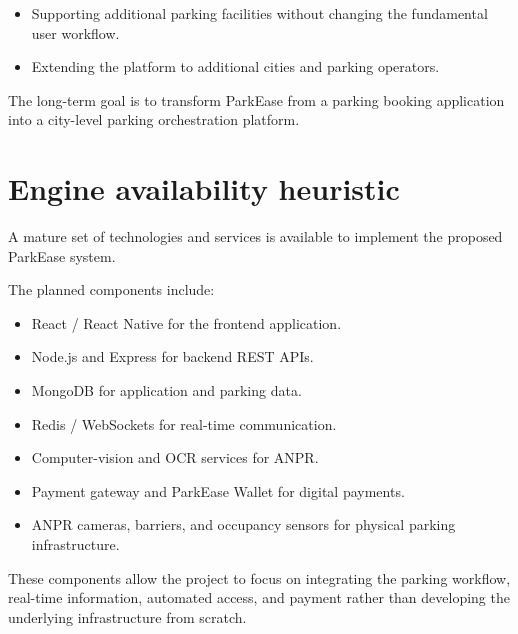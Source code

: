 \documentclass[12pt,a4paper]{article}
\begin{document}
\begin{enumerate}
\begin{itemize}
    \item Supporting additional parking facilities without changing the fundamental user workflow.

    \item Extending the platform to additional cities and parking operators.
\end{itemize}

The long-term goal is to transform ParkEase from a parking booking application into a city-level parking orchestration platform.


\section{Engine availability heuristic}

A mature set of technologies and services is available to implement the proposed ParkEase system.

The planned components include:

\begin{itemize}
    \item React / React Native for the frontend application.

    \item Node.js and Express for backend REST APIs.

    \item MongoDB for application and parking data.

    \item Redis / WebSockets for real-time communication.

    \item Computer-vision and OCR services for ANPR.

    \item Payment gateway and ParkEase Wallet for digital payments.

    \item ANPR cameras, barriers, and occupancy sensors for physical parking infrastructure.
\end{itemize}

These components allow the project to focus on integrating the parking workflow, real-time information, automated access, and payment rather than developing the underlying infrastructure from scratch.



\end{enumerate}
\end{document}
